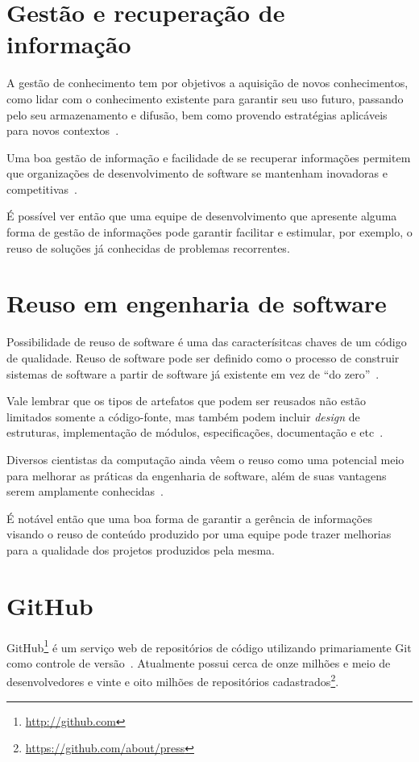 \section{Gestão e recuperação de informação}

A gestão de conhecimento tem por objetivos a aquisição de novos conhecimentos, como lidar com o conhecimento existente para garantir seu uso futuro, passando pelo seu armazenamento e difusão, bem como provendo estratégias aplicáveis para novos contextos~\cite{Bjornson2008}.

Uma boa gestão de informação e facilidade de se recuperar informações permitem que organizações de desenvolvimento de software se mantenham inovadoras e competitivas~\cite{Rabelo2015}.

É possível ver então que uma equipe de desenvolvimento que apresente alguma forma de gestão de informações pode garantir facilitar e estimular, por exemplo, o reuso de soluções já conhecidas de problemas recorrentes.

\section{Reuso em engenharia de software}

Possibilidade de reuso de software é uma das caracterísitcas chaves de um código de qualidade. Reuso de software pode ser definido como o processo de construir sistemas de software a partir de software já existente em vez de ``do zero''~\cite{Krueger1992}.

Vale lembrar que os tipos de artefatos que podem ser reusados não estão limitados somente a código-fonte, mas também podem incluir \textit{design} de estruturas, implementação de módulos, especificações, documentação e etc~\cite{Freeman1993}.

Diversos cientistas da computação ainda vêem o reuso como uma potencial meio para melhorar as práticas da engenharia de software, além de suas vantagens serem amplamente conhecidas~\cite{Krueger1992}.

É notável então que uma boa forma de garantir a gerência de informações visando o reuso de conteúdo produzido por uma equipe pode trazer melhorias para a qualidade dos projetos produzidos pela mesma.

\section{GitHub}

GitHub\footnote{\url{http://github.com}} é um serviço web de repositórios de código utilizando primariamente Git como controle de versão~\cite{Figueira2015}. Atualmente possui cerca de onze milhões e meio de desenvolvedores e vinte e oito milhões de repositórios cadastrados\footnote{\url{https://github.com/about/press}}.

